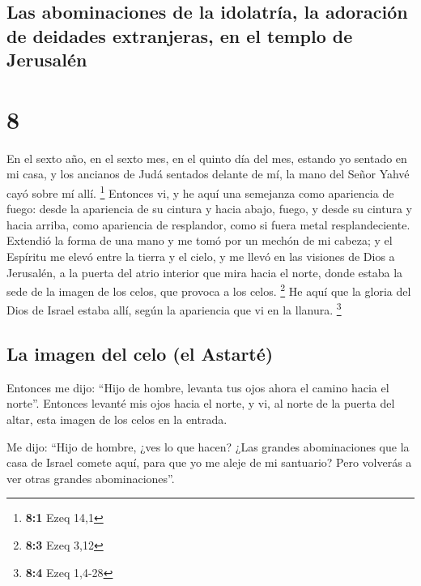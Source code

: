 \hypertarget{las-abominaciones-de-la-idolatruxeda-la-adoraciuxf3n-de-deidades-extranjeras-en-el-templo-de-jerusaluxe9n}{%
\subsection{Las abominaciones de la idolatría, la adoración de deidades
extranjeras, en el templo de
Jerusalén}\label{las-abominaciones-de-la-idolatruxeda-la-adoraciuxf3n-de-deidades-extranjeras-en-el-templo-de-jerusaluxe9n}}

\hypertarget{section-7}{%
\section{8}\label{section-7}}

 En el sexto año, en el sexto mes, en el quinto día del
mes, estando yo sentado en mi casa, y los ancianos de Judá sentados
delante de mí, la mano del Señor Yahvé cayó sobre mí allí. \footnote{\textbf{8:1}
  Ezeq 14,1}  Entonces vi, y he aquí una semejanza como
apariencia de fuego: desde la apariencia de su cintura y hacia abajo,
fuego, y desde su cintura y hacia arriba, como apariencia de resplandor,
como si fuera metal resplandeciente.  Extendió la forma de
una mano y me tomó por un mechón de mi cabeza; y el Espíritu me elevó
entre la tierra y el cielo, y me llevó en las visiones de Dios a
Jerusalén, a la puerta del atrio interior que mira hacia el norte, donde
estaba la sede de la imagen de los celos, que provoca a los celos.
\footnote{\textbf{8:3} Ezeq 3,12}  He aquí que la gloria
del Dios de Israel estaba allí, según la apariencia que vi en la
llanura. \footnote{\textbf{8:4} Ezeq 1,4-28}

\hypertarget{la-imagen-del-celo-el-astartuxe9}{%
\subsection{La imagen del celo (el
Astarté)}\label{la-imagen-del-celo-el-astartuxe9}}

 Entonces me dijo: ``Hijo de hombre, levanta tus ojos
ahora el camino hacia el norte''. Entonces levanté mis ojos hacia el
norte, y vi, al norte de la puerta del altar, esta imagen de los celos
en la entrada.

 Me dijo: ``Hijo de hombre, ¿ves lo que hacen? ¿Las
grandes abominaciones que la casa de Israel comete aquí, para que yo me
aleje de mi santuario? Pero volverás a ver otras grandes
abominaciones''.

